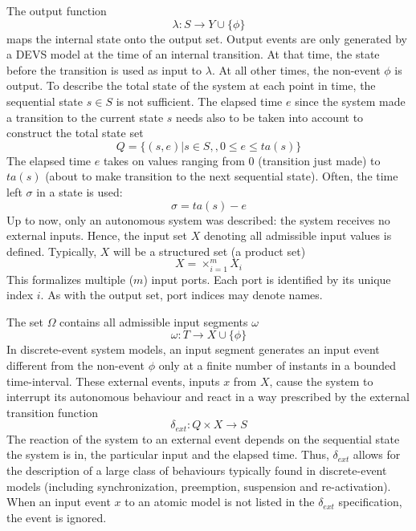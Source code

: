 The output function
\begin{equation}
    \lambda : S \rightarrow Y \cup \{ \phi \}
\end{equation}
maps the internal state onto the output set. Output events are only generated by a DEVS model at the time of an internal 
transition. At that time, the state before the transition is used as input to $\lambda$. At all other times, the non-event 
$\phi$ is output. To describe the total state of the system at each point in time, the sequential state $s \in S$ is not 
sufficient. The elapsed time $e$ since the system made a transition to the current state $s$ needs also to be taken into 
account to construct the total state set
\begin{equation}
    Q = \{ (s,e) | s \in S,, 0 \leq e \leq ta(s)\}
\end{equation}
The elapsed time $e$ takes on values ranging from 0 (transition just made) to $ta(s)$ (about to make transition to the next
sequential state). Often, the time left $\sigma$ in a state is used:
\begin{equation}
    \sigma = ta(s) - e
\end{equation}
Up to now, only an autonomous system was described: the system receives no external inputs. Hence, the input set $X$ 
denoting all admissible input values is defined. Typically, $X$ will be a structured set (a product set)
\begin{equation}
    X = \times_{i=1}^m X_i
\end{equation}
This formalizes multiple ($m$) input ports. Each port is identified by its unique index $i$. As with the output set, 
port indices may denote names. 

The set $\Omega$ contains all admissible input segments $\omega$
\begin{equation}
    \omega : T \rightarrow X \cup \{ \phi \}
\end{equation}
In discrete-event system models, an input segment generates an input event different from the non-event $\phi$ only at a finite 
number of instants in a bounded time-interval. These external events, inputs $x$ from $X$, cause the system to interrupt its 
autonomous behaviour and react in a way prescribed by the external transition function
\begin{equation}
    \delta_{ext}: Q \times X \rightarrow S
\end{equation}
The reaction of the system to an external event depends on the sequential state the system is in, the particular input and 
the elapsed time. Thus, $\delta_{ext}$ allows for the description of a large class of behaviours typically found in 
discrete-event models (including synchronization, preemption, suspension and re-activation). When an input event $x$ to an 
atomic model is not listed in the $\delta_{ext}$ specification, the event is ignored.

